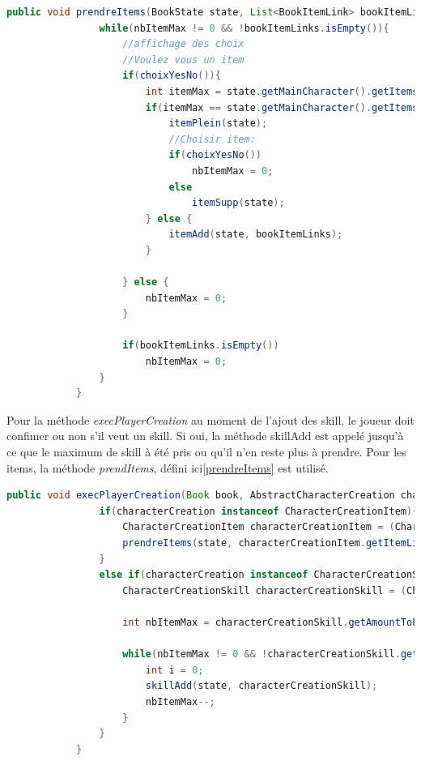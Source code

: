 		\begin{lstlisting}[gobble=12, language=java, label=prendreItems]
			public void prendreItems(BookState state, List<BookItemLink> bookItemLinks, int nbItemMax){
				while(nbItemMax != 0 && !bookItemLinks.isEmpty()){
					//affichage des choix
					//Voulez vous un item
					if(choixYesNo()){
						int itemMax = state.getMainCharacter().getItemsMax();
						if(itemMax == state.getMainCharacter().getItems().size()){
							itemPlein(state);
							//Choisir item:
							if(choixYesNo())
								nbItemMax = 0;
							else
								itemSupp(state);
						} else {
							itemAdd(state, bookItemLinks);
						}

					} else {
						nbItemMax = 0;
					}

					if(bookItemLinks.isEmpty())
						nbItemMax = 0;
				}
			}
				\end{lstlisting}

		Pour la méthode \textit{execPlayerCreation} au moment de l'ajout des skill, le joueur doit confimer ou non s'il veut un skill. Si oui, la méthode skillAdd est appelé jusqu'à ce que le maximum de skill à été pris ou qu'il n'en reste plus à prendre. Pour les items, la méthode \textit{prendItems}, défini ici\ref{prendreItems} est utilisé.

		\begin{lstlisting}[gobble=12, language=java, label=execPlayerCreationCode]
		public void execPlayerCreation(Book book, AbstractCharacterCreation characterCreation, BookState state){
				if(characterCreation instanceof CharacterCreationItem){
					CharacterCreationItem characterCreationItem = (CharacterCreationItem) characterCreation;
					prendreItems(state, characterCreationItem.getItemLinks(), characterCreationItem.getAmountToPick());
				}
				else if(characterCreation instanceof CharacterCreationSkill){
					CharacterCreationSkill characterCreationSkill = (CharacterCreationSkill) characterCreation;

					int nbItemMax = characterCreationSkill.getAmountToPick();

					while(nbItemMax != 0 && !characterCreationSkill.getSkillLinks().isEmpty()){
						int i = 0;
						skillAdd(state, characterCreationSkill);
						nbItemMax--;
					}
				}
			}
		\end{lstlisting}

